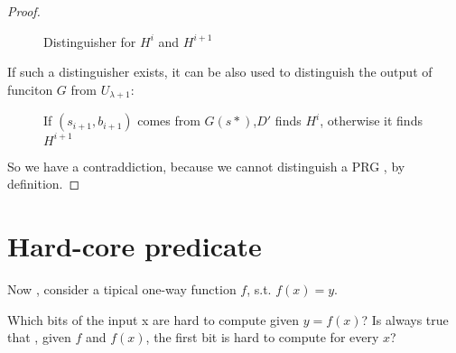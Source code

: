 \begin{proof}
\begin{figure}[h!]
   \caption{Distinguisher for $H^{i}$ and $H^{i+1}$}
   \label{fig:disths1}
\end{figure}
If such a distinguisher exists, it can be also used to distinguish the output of
funciton $G$ from $U_{\lambda + 1}$:


\begin{figure}[h!]
   \centering
   \sdinit{}
   \caption{\small{If $(s_{i+1}, b_{i+1})$ comes from $G(s*)$,$D'$ finds $H^{i}$,
   otherwise it finds $H^{i+1}$}}
   \label{fig:red1}
\end{figure}
So we have a contraddiction, because we cannot distinguish a PRG , by
definition.
\end{proof}
\section{Hard-core predicate}

Now , consider a tipical one-way function $f$, s.t. $f(x)=y$.
\begin{question}
    Which  bits of the input x are hard to compute given $y=f(x)$?
    Is always true that , given $f$ and $f(x)$, the first bit is hard to compute
    for every $x$?
\end{question}

